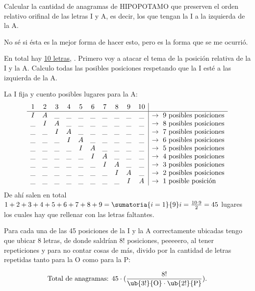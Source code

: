 \begin{enunciado}{\ejExtra}
  Calcular la cantidad de anagramas de HIPOPOTAMO que preserven el orden
  relativo orifinal de las letras I y A, es decir, los que tengan la I
  a la izquierda de la A.
\end{enunciado}

No sé si ésta es la mejor forma de hacer esto, pero es la forma que
se me ocurrió.\par
En total hay \underline{10 letras}, .
Primero voy a atacar el tema de la posición relativa de la I y la A.
Calculo todas las posibles posiciones respetando que la I esté a las izquierda de la A.\par
La I fija y cuento posibles lugares para la A:
$$
  \begin{array}{cccccccccc | l}
    1  & 2  & 3  & 4  & 5  & 6  & 7  & 8  & 9  & 10 &                                   \\ \hline
    I  & A  & \_ & \_ & \_ & \_ & \_ & \_ & \_ & \_ & \to \text{ 9 posibles posiciones} \\
    \_ & I  & A  & \_ & \_ & \_ & \_ & \_ & \_ & \_ & \to \text{ 8 posibles posiciones} \\
    \_ & \_ & I  & A  & \_ & \_ & \_ & \_ & \_ & \_ & \to \text{ 7 posibles posiciones} \\
    \_ & \_ & \_ & I  & A  & \_ & \_ & \_ & \_ & \_ & \to \text{ 6 posibles posiciones} \\
    \_ & \_ & \_ & \_ & I  & A  & \_ & \_ & \_ & \_ & \to \text{ 5 posibles posiciones} \\
    \_ & \_ & \_ & \_ & \_ & I  & A  & \_ & \_ & \_ & \to \text{ 4 posibles posiciones} \\
    \_ & \_ & \_ & \_ & \_ & \_ & I  & A  & \_ & \_ & \to \text{ 3 posibles posiciones} \\
    \_ & \_ & \_ & \_ & \_ & \_ & \_ & I  & A  & \_ & \to \text{ 2 posibles posiciones} \\
    \_ & \_ & \_ & \_ & \_ & \_ & \_ & \_ & I  & A  & \to \text{ 1 posible posición}
  \end{array}
$$
De ahí salen en total $1 + 2+3+4+5+6+7+8+9 = \sumatoria{i=1}{9} i = \frac{10 \cdot 9}{2} = 45$ lugares los cuales hay que
rellenar con las letras faltantes.\par
Para cada una de las 45 posiciones de la I y la A correctamente ubicadas tengo que ubicar 8 letras, de donde saldrían
$8!$ posiciones, peeeeero, al tener repeticiones y para no contar cosas de más, divido por la cantidad de letras repetidas tanto para la O como para la P:\par
$$
  \text{Total de anagramas: } 45 \cdot (\frac{8!}{\ub{3!}{\text{O}} \cdot \ub{2!}{\text{P}} }).
$$

\begin{aportes}
\item {}
\end{aportes}
